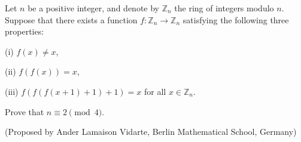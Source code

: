 Let $n$ be a positive integer, and denote by $\mathbb{Z}_n$ the ring of integers modulo $n$. Suppose that there exists a function $f:\mathbb{Z}_n\to\mathbb{Z}_n$ satisfying the following three properties:

(i) $f(x)\neq x$,

(ii) $f(f(x))=x$,

(iii) $f(f(f(x+1)+1)+1)=x$ for all $x\in\mathbb{Z}_n$.

Prove that $n\equiv 2 \pmod4$.

(Proposed by Ander Lamaison Vidarte, Berlin Mathematical School, Germany)